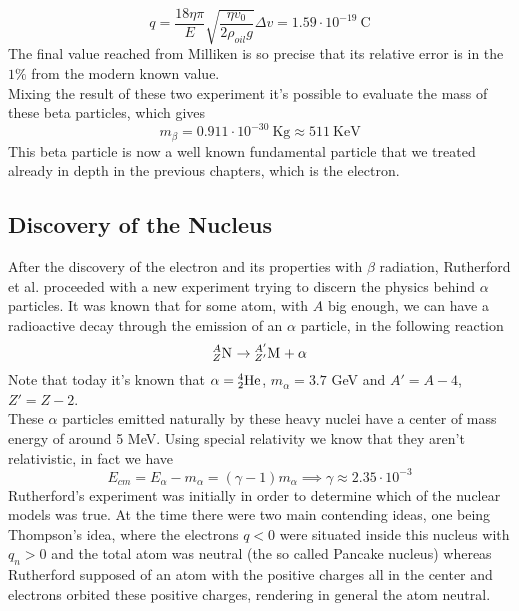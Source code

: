 \documentclass[../qm.tex]{subfiles}
\begin{document}
\begin{equation}
	q=\frac{18\eta\pi}{E}\sqrt{\frac{\eta v_0}{2\rho_{oil}g}}\Delta v=1.59\cdot10^{-19}\ \mathrm{C}
	\label{eq:echargemill}
\end{equation}
The final value reached from Milliken is so precise that its relative error is in the $1\%$ from the modern known value.\\
Mixing the result of these two experiment it's possible to evaluate the mass of these beta particles, which gives
\begin{equation}
	m_\beta=0.911\cdot10^{-30}\ \mathrm{Kg}\approx511\ \mathrm{KeV}
	\label{eq:massbeta}
\end{equation}
This beta particle is now a well known fundamental particle that we treated already in depth in the previous chapters, which is the electron.
\subsection{Discovery of the Nucleus}
After the discovery of the electron and its properties with $\beta$ radiation, Rutherford et al. proceeded with a new experiment trying to discern the physics behind $\alpha$ particles. It was known that for some atom, with $A$ big enough, we can have a radioactive decay through the emission of an $\alpha$ particle, in the following reaction
\begin{equation}
	\nuc{N}{A}{Z}\to\nuc{M}{A'}{Z'}+\alpha
	\label{eq:alphadecruth}
\end{equation}
Note that today it's known that $\alpha=\nuc{He}{4}{2}$, $m_\alpha=3.7$ GeV and $A'=A-4$, $Z'=Z-2$.\\
These $\alpha$ particles emitted naturally by these heavy nuclei have a center of mass energy of around 5 MeV. Using special relativity we know that they aren't relativistic, in fact we have
\begin{equation*}
	E_{cm}=E_\alpha-m_\alpha=(\gamma-1)m_\alpha\implies\gamma\approx2.35\cdot10^{-3}
\end{equation*}
Rutherford's experiment was initially in order to determine which of the nuclear models was true. At the time there were two main contending ideas, one being Thompson's idea, where the electrons $q<0$ were situated inside this nucleus with $q_n>0$ and the total atom was neutral (the so called Pancake nucleus) whereas Rutherford supposed of an atom with the positive charges all in the center and electrons orbited these positive charges, rendering in general the atom neutral.\\
\end{document}
